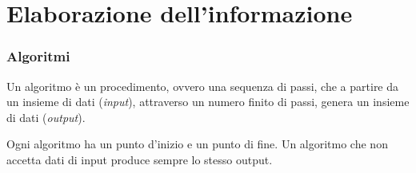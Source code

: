 \part{Elaborazione dell'informazione}

\section{Algoritmi}

Un algoritmo è un procedimento, ovvero una sequenza di passi, che a partire da un insieme di dati (\emph{input}), attraverso un numero finito di passi, genera un insieme di dati (\emph{output}).

Ogni algoritmo ha un punto d'inizio e un punto di fine.
Un algoritmo che non accetta dati di input produce sempre lo stesso output.

